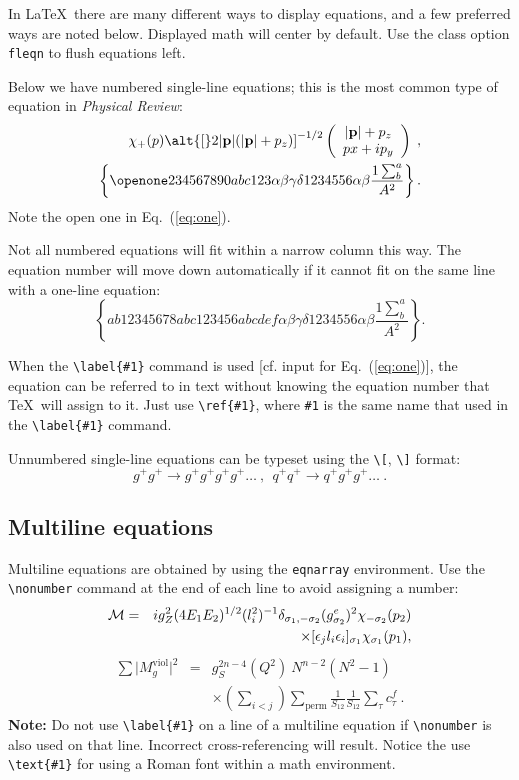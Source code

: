 \documentclass[%
 preprint, linenumbers,
 amsmath,amssymb,
 aps, physrev,
]{revtex4-2}
\begin{document}
In \LaTeX\ there are many different ways to display equations, and a
few preferred ways are noted below. Displayed math will center by
default. Use the class option \verb+fleqn+ to flush equations left.

Below we have numbered single-line equations; this is the most common
type of equation in \textit{Physical Review}:
\begin{eqnarray}
\chi_+(p)\alt{\bf [}2|{\bf p}|(|{\bf p}|+p_z){\bf ]}^{-1/2}
\left(
\begin{array}{c}
|{\bf p}|+p_z\\
px+ip_y
\end{array}\right)\;,
\\
\left\{%
 \openone234567890abc123\alpha\beta\gamma\delta1234556\alpha\beta
 \frac{1\sum^{a}_{b}}{A^2}%
\right\}%
\label{eq:one}.
\end{eqnarray}
Note the open one in Eq.~(\ref{eq:one}).

Not all numbered equations will fit within a narrow column this
way. The equation number will move down automatically if it cannot fit
on the same line with a one-line equation:
\begin{equation}
\left\{
 ab12345678abc123456abcdef\alpha\beta\gamma\delta1234556\alpha\beta
 \frac{1\sum^{a}_{b}}{A^2}%
\right\}.
\end{equation}

When the \verb+\label{#1}+ command is used [cf. input for
Eq.~(\ref{eq:one})], the equation can be referred to in text without
knowing the equation number that \TeX\ will assign to it. Just
use \verb+\ref{#1}+, where \verb+#1+ is the same name that used in
the \verb+\label{#1}+ command.

Unnumbered single-line equations can be typeset
using the \verb+\[+, \verb+\]+ format:
\[g^+g^+ \rightarrow g^+g^+g^+g^+ \dots ~,~~q^+q^+\rightarrow
q^+g^+g^+ \dots ~. \]


\subsection{Multiline equations}

Multiline equations are obtained by using the \verb+eqnarray+
environment.  Use the \verb+\nonumber+ command at the end of each line
to avoid assigning a number:
\begin{eqnarray}
{\cal M}=&&ig_Z^2(4E_1E_2)^{1/2}(l_i^2)^{-1}
\delta_{\sigma_1,-\sigma_2}
(g_{\sigma_2}^e)^2\chi_{-\sigma_2}(p_2)\nonumber\\
&&\times
[\epsilon_jl_i\epsilon_i]_{\sigma_1}\chi_{\sigma_1}(p_1),
\end{eqnarray}
\begin{eqnarray}
\sum \vert M^{\text{viol}}_g \vert ^2&=&g^{2n-4}_S(Q^2)~N^{n-2}
        (N^2-1)\nonumber \\
 & &\times \left( \sum_{i<j}\right)
  \sum_{\text{perm}}
 \frac{1}{S_{12}}
 \frac{1}{S_{12}}
 \sum_\tau c^f_\tau~.
\end{eqnarray}
\textbf{Note:} Do not use \verb+\label{#1}+ on a line of a multiline
equation if \verb+\nonumber+ is also used on that line. Incorrect
cross-referencing will result. Notice the use \verb+\text{#1}+ for
using a Roman font within a math environment.
\end{document}
